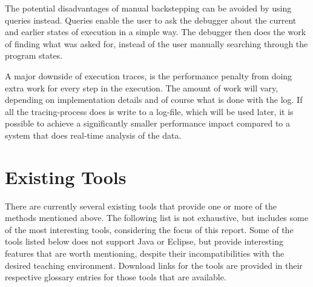 The potential disadvantages of manual backstepping can be avoided by using queries instead.
Queries enable the user to ask the debugger about the current and earlier states of execution in a simple way.
The debugger then does the work of finding what was asked for, instead of the user manually searching through the program states.

A major downside of execution traces, is the performance penalty from doing extra work for every step in the execution.
The amount of work will vary, depending on implementation details and of course what is done with the log.
If all the tracing-process does is write to a log-file, which will be used later, it is possible to achieve a significantly smaller performance impact compared to a system that does real-time analysis of the data.

\section{Existing Tools}\label{PreTools}%

There are currently several existing tools that provide one or more of the methods mentioned above.
The following list is not exhaustive, but includes some of the most interesting tools, considering the focus of this report.
Some of the tools listed below does not support Java or Eclipse, but provide interesting features that are worth mentioning, despite their incompatibilities with the desired teaching environment.
Download links for the tools are provided in their respective glossary entries for those tools that are available.

